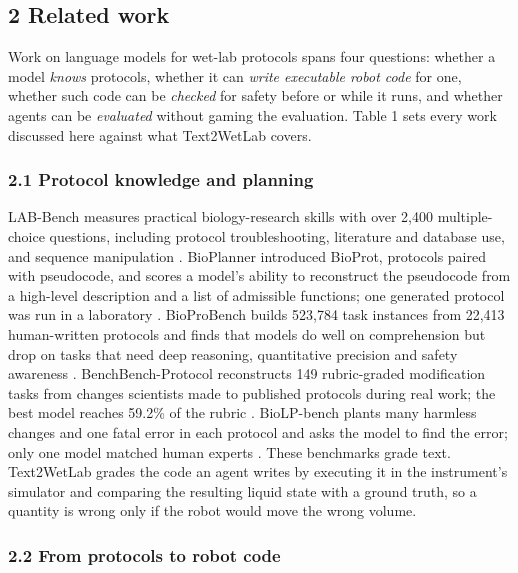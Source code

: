 \documentclass[
]{article}
\begin{document}
\subsection{2 Related work}\label{related-work}

Work on language models for wet-lab protocols spans four questions:
whether a model \emph{knows} protocols, whether it can \emph{write
executable robot code} for one, whether such code can be \emph{checked}
for safety before or while it runs, and whether agents can be
\emph{evaluated} without gaming the evaluation. Table 1 sets every work
discussed here against what Text2WetLab covers.

\subsubsection{2.1 Protocol knowledge and
planning}\label{protocol-knowledge-and-planning}

LAB-Bench measures practical biology-research skills with over 2,400
multiple-choice questions, including protocol troubleshooting,
literature and database use, and sequence manipulation
\citep{laurent2024labbench}. BioPlanner introduced BioProt, protocols
paired with pseudocode, and scores a model's ability to reconstruct the
pseudocode from a high-level description and a list of admissible
functions; one generated protocol was run in a laboratory
\citep{odonoghue2023bioplanner}. BioProBench builds 523,784 task
instances from 22,413 human-written protocols and finds that models do
well on comprehension but drop on tasks that need deep reasoning,
quantitative precision and safety awareness \citep{liu2025bioprobench}.
BenchBench-Protocol reconstructs 149 rubric-graded modification tasks
from changes scientists made to published protocols during real work;
the best model reaches 59.2\% of the rubric
\citep{sivakumar2026benchbench}. BioLP-bench plants many harmless
changes and one fatal error in each protocol and asks the model to find
the error; only one model matched human experts
\citep{ivanov2024biolpbench}. These benchmarks grade text. Text2WetLab
grades the code an agent writes by executing it in the instrument's
simulator and comparing the resulting liquid state with a ground truth,
so a quantity is wrong only if the robot would move the wrong volume.

\subsubsection{2.2 From protocols to robot
code}\label{from-protocols-to-robot-code}
\end{document}
